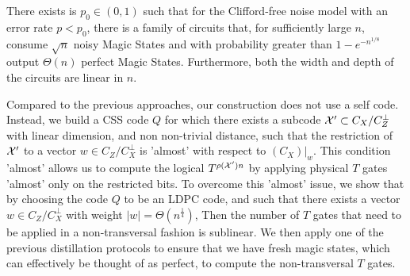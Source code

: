 \begin{theorem}
  \label{theorem:main}
There exists is $p_0 \in (0,1)$ such that for the Clifford-free noise model with an error rate $p < p_{0}$, there is a family of circuits that, for sufficiently large $n$, consume $\sqrt{n}$ noisy Magic States and with  probability greater than $1 - e^{-n^{1/8}}$ output $\Theta(n)$ perfect Magic States. Furthermore, both the width and depth of the circuits are linear in $n$.
\end{theorem}
Compared to the previous approaches, our construction does not use a self \trig code. Instead, we build a CSS code $Q$ for which there exists a subcode $\mathcal{X}^\prime \subset C_{X}/C_{Z}^\perp$ with linear dimension, and non non-trivial distance, such that the restriction of $\mathcal{X}^\prime$ to a vector $w \in C_{Z}/C_{X}^\perp$ is 'almost' \trig with respect to $(C_{X})|_{w}$. This condition 'almost' allows us to compute the logical $T^{\rho(\mathcal{X}^\prime)n}$ by applying physical $T$ gates 'almost' only on the restricted bits. To overcome this 'almost' issue, we show that by choosing the code $Q$ to be an LDPC code, and such that there exists a vector $w\in C_{Z}/C_{X}^\perp$ with weight $|w| = \Theta(n^\frac{1}{4})$, Then the number of $T$ gates that need to be applied in a non-transversal fashion is sublinear. We then apply one of the previous distillation protocols to ensure that we have fresh magic states, which can effectively be thought of as perfect, to compute the non-transversal $T$ gates.

